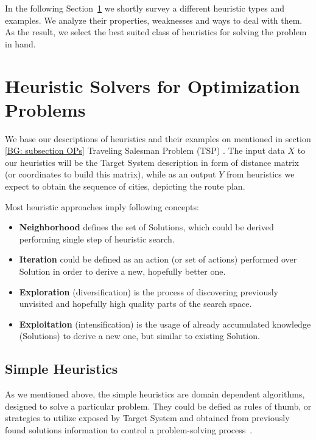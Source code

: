 In the following Section~\ref{bg: section heuristics} we shortly survey a different heuristic types and examples. We analyze their properties, weaknesses and ways to deal with them. As the result, we select the best suited class of heuristics for solving the problem in hand.

\section{Heuristic Solvers for Optimization Problems}\label{bg: section heuristics}
We base our descriptions of heuristics and their examples on mentioned in section \ref{BG: subsection OPs} Traveling Salesman Problem (TSP) \cite{applegate2006traveling}. The input data $X$ to our heuristics will be the Target System description in form of distance matrix (or coordinates to build this matrix), while as an output $Y$ from heuristics we expect to obtain the sequence of cities, depicting the route plan.


Most heuristic approaches imply following concepts:
\begin{itemize}[itemsep=8pt]
	\item \textbf{Neighborhood} defines the set of Solutions, which could be derived performing single step of heuristic search.
	\item \textbf{Iteration} could be defined as an action (or set of actions) performed over Solution in order to derive a new, hopefully better one.
	\item \textbf{Exploration} (diversification) is the process of discovering previously unvisited and hopefully high quality parts of the search space.
	\item \textbf{Exploitation} (intensification) is the usage of already accumulated knowledge (Solutions) to derive a new one, but similar to existing Solution.
\end{itemize}


\subsection{Simple Heuristics}
As we mentioned above, the simple heuristics are domain dependent algorithms, designed to solve a particular problem.
They could be defied as rules of thumb, or strategies to utilize exposed by Target System and obtained from previously found solutions information to control a problem-solving process~\cite{pearl1984intelligent}. 

